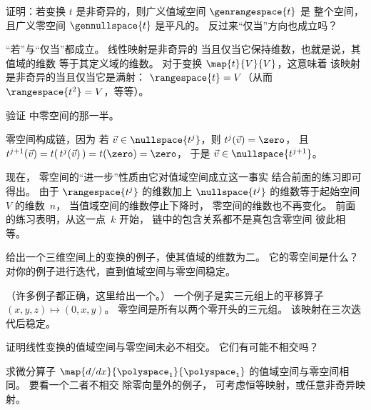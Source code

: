 \begin{exercises}
  \recommended\item
    证明：若变换 $t$ 是非奇异的，则广义值域空间 $\genrangespace{t}$ 是
    整个空间，且广义零空间 $\gennullspace{t}$ 是平凡的。
    反过来“仅当”方向也成立吗？
    \begin{answer}
      “若”与“仅当”都成立。
      线性映射是非奇异的
      当且仅当它保持维数，也就是说，其值域的维数
      等于其定义域的维数。
      对于变换 $\map{t}{V}{V}$，这意味着
      该映射是非奇异的当且仅当它是满射：
      $\rangespace{t}=V$（从而 $\rangespace{t^2}=V$，等等）。
    \end{answer}
  \item \label{exer:RangeAndNullChains}
    验证  中零空间的那一半。
    \begin{answer}
      零空间构成链，因为
      若 $\vec{v}\in\nullspace{t^j}$，则 $t^j(\vec{v})=\zero$，
      且 $t^{j+1}(\vec{v})=t(\,t^j(\vec{v})\,)=t(\zero)=\zero$，
      于是 $\vec{v}\in\nullspace{t^{j+1}}$。

      现在，
      零空间的“进一步”性质由它对值域空间成立这一事实
      结合前面的练习即可得出。
      由于 $\rangespace{t^j}$ 的维数加上
      $\nullspace{t^j}$ 的维数等于起始空间~$V$ 的维数~$n$，
      当值域空间的维数停止下降时，
      零空间的维数也不再变化。
      前面的练习表明，从这一点~$k$ 开始，
      链中的包含关系都不是真包含\Dash 零空间
      彼此相等。
    \end{answer}
  \recommended\item
    给出一个三维空间上的变换的例子，使其值域的维数为二。
    它的零空间是什么？
    对你的例子进行迭代，直到值域空间与零空间稳定。
    \begin{answer}
      （许多例子都正确，这里给出一个。）
      一个例子是实三元组上的平移算子
      \( (x,y,z)\mapsto (0,x,y) \)。
      零空间是所有以两个零开头的三元组。
      该映射在三次迭代后稳定。
     \end{answer}
  \item
      证明线性变换的值域空间与零空间未必不相交。
      它们有可能不相交吗？
      \begin{answer}
        求微分算子
        \( \map{d/dx}{\polyspace_1}{\polyspace_1} \) 的值域空间与零空间相同。
        要看一个二者不相交\Dash
        除零向量外\Dash 的例子，
        可考虑恒等映射，或任意非奇异映射。
      \end{answer}
\end{exercises}

















